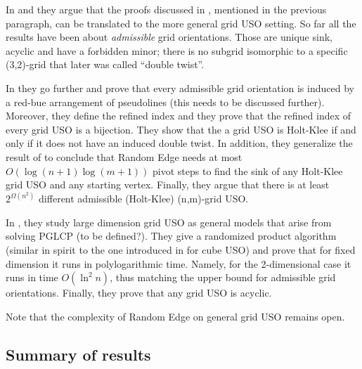 \documentclass[a4paper,10pt]{article}
\begin{document}
In \cite{linepoint} and \cite{falkthesis} they argue that the proofs discussed in \cite{linepointstoc}, mentioned in the previous paragraph, can be translated to the more general grid USO setting. So far all the results have been about \emph{admissible} grid orientations. Those are unique sink, acyclic and have a forbidden minor; there is no subgrid isomorphic to a specific (3,2)-grid that later was called ``double twist''.

In \cite{grid05} they go further and prove that every admissible grid orientation is induced by a red-bue arrangement of pseudolines (this needs to be discussed further). Moreover, they define the refined index and they prove that the refined index of every grid USO is a bijection. They show that the a grid USO is Holt-Klee if and only if it does not have an induced double twist. In addition, they generalize the result of \cite{linepoint} to conclude that Random Edge needs at most $O(\log(n+1)\log(m+1))$ pivot steps to find the sink of any Holt-Klee grid USO and any starting vertex. Finally, they argue that there is at least $2^{\Omega(n^2)}$ different admissible (Holt-Klee) (n,m)-grid USO.

In \cite{grid08}, they study large dimension grid USO as general models that arise from solving PGLCP (to be defined?). They give a randomized product algorithm (similar in spirit to the one introduced in \cite{SW} for cube USO) and prove that for fixed dimension it runs in polylogarithmic time. Namely, for the 2-dimensional case it runs in time $O(\ln^2 n)$, thus matching the upper bound for admissible grid orientations. Finally, they prove that any grid USO is acyclic.

Note that the complexity of Random Edge on general grid USO remains open.

\subsection{Summary of results}
\end{document}
